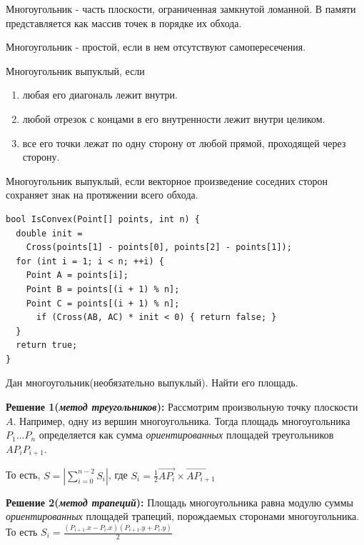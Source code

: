 \Def Многоугольник - часть плоскости, ограниченная замкнутой ломанной. В памяти представляется как массив точек в порядке их обхода.

\Def Многоугольник - простой, если в нем отсутствуют самопересечения.

\Def Многоугольник выпуклый, если \begin{enumerate}
    \item любая его диагональ лежит внутри.
    \item любой отрезок с концами в его внутренности лежит внутри целиком.
    \item все его точки лежат по одну сторону от любой прямой, проходящей через сторону.
\end{enumerate}

\Def Многоугольник выпуклый, если векторное произведение соседних
сторон сохраняет знак на протяжении всего обхода.

\begin{lstlisting}
bool IsConvex(Point[] points, int n) {
  double init = 
    Cross(points[1] - points[0], points[2] - points[1]);
  for (int i = 1; i < n; ++i) {
    Point A = points[i];
    Point B = points[(i + 1) % n];
    Point C = points[(i + 1) % n];
      if (Cross(AB, AC) * init < 0) { return false; }
  }
  return true;
}
\end{lstlisting}
\vspace{\baselineskip}
\Task Дан многоугольник(необязательно выпуклый). Найти его площадь.

\textbf{Решение 1(\textit{метод треугольников}):} \newline
Рассмотрим произвольную точку плоскости $A$. Например, одну из
вершин многоугольника. Тогда площадь многоугольника $P_1 ... P_n$
определяется как сумма \textit{ориентированных} площадей треугольников $AP_iP_{i+1}$.

То есть, $S = |\displaystyle\sum_{i=0}^{n-2} S_i|$, где $S_i = \frac{1}{2}\Vec{AP_i} \times \Vec{AP_{i+1}}$\newline

\textbf{Решение 2(\textit{метод трапеций}):} \newline
Площадь многоугольника равна модулю суммы \textit{ориентированных}
площадей трапеций, порождаемых сторонами многоугольника. То есть
$S_i = \displaystyle\frac{(P_{i+1}.x - P_i.x)(P_{i+1}.y+P_i.y)}{2}$
\pagebreak